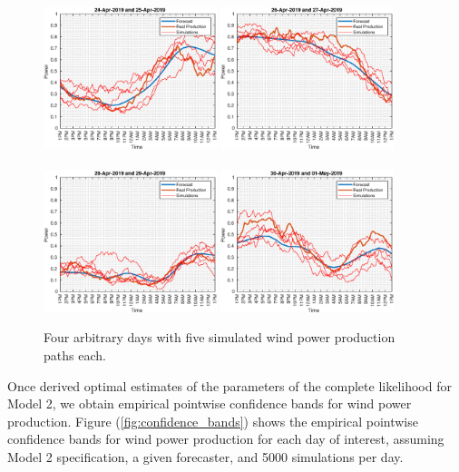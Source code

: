 \documentclass[11pt]{article}
\theoremstyle{definition}
\begin{document}
\begin{figure}[H]
\centering
\includegraphics[width=0.45\textwidth]{plots/paths/1.eps}
\includegraphics[width=0.45\textwidth]{plots/paths/2.eps}\\
\quad\\
\includegraphics[width=0.45\textwidth]{plots/paths/3.eps}
\includegraphics[width=0.45\textwidth]{plots/paths/4.eps}
\caption{Four arbitrary days with five simulated wind power production paths each.}
\label{fig:simulation_paths}
\end{figure}
Once derived optimal estimates of the parameters of the complete likelihood for Model 2, we obtain empirical pointwise confidence bands for wind power production. Figure (\ref{fig:confidence_bands}) shows the empirical pointwise confidence bands for wind power production for each day of interest, assuming Model 2 specification, a given forecaster, and 5000 simulations per day.
\end{document}
